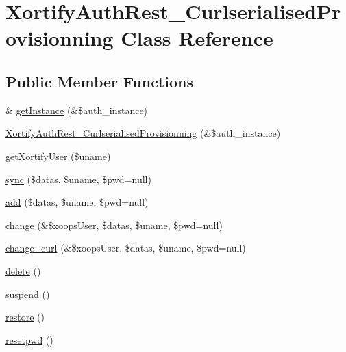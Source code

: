 \hypertarget{class_xortify_auth_rest___curlserialised_provisionning}{\section{Xortify\-Auth\-Rest\-\_\-\-Curlserialised\-Provisionning Class Reference}
\label{class_xortify_auth_rest___curlserialised_provisionning}
}
\subsection*{Public Member Functions}
\begin{DoxyCompactItemize}
\item 
\& \hyperlink{class_xortify_auth_rest___curlserialised_provisionning_a2c8eaa915c70d75289ac8a03686194f9}{get\-Instance} (\&\$auth\-\_\-instance)
\item 
\hyperlink{class_xortify_auth_rest___curlserialised_provisionning_a1910eb4c9f28b81383f5d6db148df984}{Xortify\-Auth\-Rest\-\_\-\-Curlserialised\-Provisionning} (\&\$auth\-\_\-instance)
\item 
\hyperlink{class_xortify_auth_rest___curlserialised_provisionning_a041d726ac26672547ed1504e8e0117aa}{get\-Xortify\-User} (\$uname)
\item 
\hyperlink{class_xortify_auth_rest___curlserialised_provisionning_a35dc08b0f2138eb818ff95345b73bcff}{sync} (\$datas, \$uname, \$pwd=null)
\item 
\hyperlink{class_xortify_auth_rest___curlserialised_provisionning_adfc9fcef01e7bd7b2f47e8e79d51fc63}{add} (\$datas, \$uname, \$pwd=null)
\item 
\hyperlink{class_xortify_auth_rest___curlserialised_provisionning_ae1f0971b9712c794620cf309164e43af}{change} (\&\$xoops\-User, \$datas, \$uname, \$pwd=null)
\item 
\hyperlink{class_xortify_auth_rest___curlserialised_provisionning_aba6f598c234d191a3b3934f90b35fd9f}{change\-\_\-curl} (\&\$xoops\-User, \$datas, \$uname, \$pwd=null)
\item 
\hyperlink{class_xortify_auth_rest___curlserialised_provisionning_a13bdffdd926f26b825ea57066334ff01}{delete} ()
\item 
\hyperlink{class_xortify_auth_rest___curlserialised_provisionning_ad73006a505121228f3b075c2409787d2}{suspend} ()
\item 
\hyperlink{class_xortify_auth_rest___curlserialised_provisionning_aa1371f22826cf8cde4454c9b467203d0}{restore} ()
\item 
\hyperlink{class_xortify_auth_rest___curlserialised_provisionning_a06d70fbd3a2db390b6f2530c0076628e}{resetpwd} ()
\end{DoxyCompactItemize}

